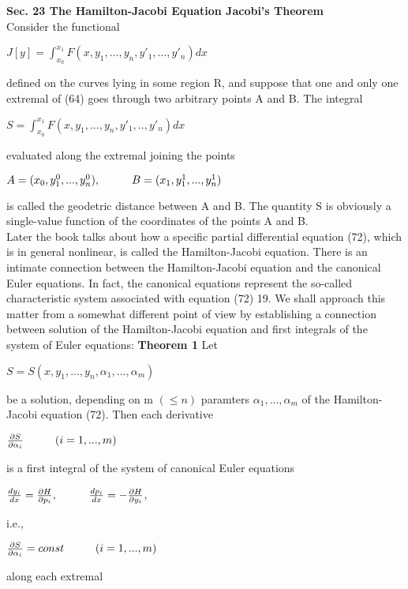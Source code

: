 \documentclass{article}
\newcommand\tab[1][1cm]{\hspace*{#1}}
\begin{document}
\textbf {Sec. 23 The Hamilton-Jacobi Equation Jacobi's Theorem} \\ Consider the functional
\begin{center}
$J[y] = \int_{x_0}^{x_1} F(x, y_1 ,..., y_n , y'_1,..., y'_n)dx$
\end{center}
defined on the curves lying in some region R, and suppose that one and only one extremal of (64) goes through two arbitrary points A and B. The integral
\begin{center}
$S = \int_{x_0}^{x_1} F(x, y_1, ..., y_n , y'_1 ,.., y'_n)dx$
\end{center}
evaluated along the extremal joining the points
\begin{center}
$A = (x_0, y_1^0 ,..., y_n^0), \tab B = (x_1 , y_1^1 ,..., y_n^1)$
\end{center}
is called the geodetric distance between A and B. The quantity S is obviously a single-value function of the coordinates of the points A and B.
\\
Later the book talks about how a specific partial differential equation (72), which is in general nonlinear, is called the Hamilton-Jacobi equation. There is an intimate connection between the Hamilton-Jacobi equation and the canonical Euler equations. In fact, the canonical equations represent the so-called characteristic system associated with equation (72) 19. We shall approach this matter from a somewhat different point of view by establishing a connection between solution of the Hamilton-Jacobi equation and first integrals of the system of Euler equations:
\textbf {Theorem 1} Let
\begin{center}
$S = S(x, y_1, ..., y_n , \alpha_1 ,..., \alpha_m)$
\end{center}
be a solution, depending on m $( \leq n)$ paramters $\alpha_1 ,..., \alpha_m$ of the Hamilton-Jacobi equation (72). Then each derivative
\begin{center}
$\frac{\partial S}{\partial \alpha_i} \tab (i = 1, ... , m)$
\end{center}
is a first integral of the system of canonical Euler equations
\begin{center}
$\frac{d y_i}{dx} = \frac{\partial H}{\partial p_i}, \tab \frac{dp_i}{dx} = - \frac{\partial H}{\partial y_i}$,
\end{center}
i.e., 
\begin{center}
$\frac{\partial S}{\partial \alpha_i} = const \tab (i = 1,..., m)$
\end{center}
along each extremal
\end{document}
